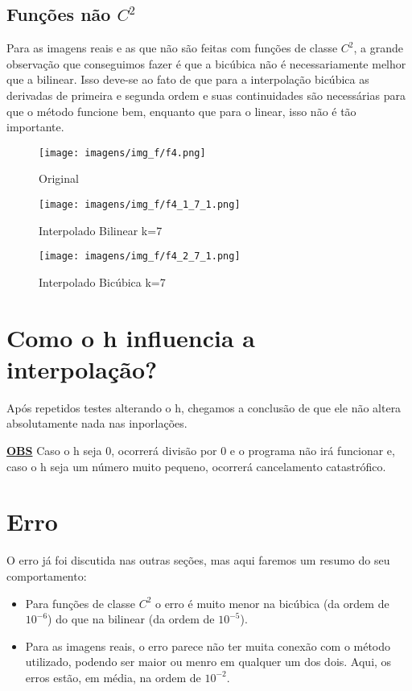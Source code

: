 \documentclass[12pt]{article}
\newcommand{\mytitle}[1]{\textbf{\underline{#1}}}
\begin{document}
\subsection{Funções não $C^2$}
Para as imagens reais e as que não são feitas com funções de classe $C^2$, a grande observação que conseguimos fazer é que a bicúbica não é necessariamente melhor que a bilinear. Isso deve-se ao fato de que para a interpolação bicúbica as derivadas de primeira e segunda ordem e suas continuidades são necessárias para que o método funcione bem, enquanto que para o linear, isso não é tão importante.

\begin{figure}[H]
  \centering
  \begin{minipage}{.5\textwidth}
    \centering
    \texttt{[image: imagens/img\_f/f4.png]}
    \caption{Original}
  \end{minipage}
  \begin{minipage}{.5\linewidth}
  \end{minipage}
  \begin{minipage}{.5\textwidth}
    \centering
    \texttt{[image: imagens/img\_f/f4\_1\_7\_1.png]}
    \caption{Interpolado Bilinear k=7}
  \end{minipage}%
  \begin{minipage}{.5\textwidth}
    \centering
    \texttt{[image: imagens/img\_f/f4\_2\_7\_1.png]}
    \caption{Interpolado Bicúbica k=7}
  \end{minipage}
\end{figure}

\newpage
\section{Como o h influencia a interpolação?}
Após repetidos testes alterando o h, chegamos a conclusão de que ele não altera absolutamente nada nas inporlações.

\mytitle{OBS} Caso o h seja 0, ocorrerá divisão por 0 e o programa não irá funcionar e, caso o h seja um número muito pequeno, ocorrerá cancelamento catastrófico.

\section{Erro}
O erro já foi discutida nas outras seções, mas aqui faremos um resumo do seu comportamento:

\begin{itemize}
  
\item Para funções de classe $C^2$ o erro é muito menor na bicúbica (da ordem de $10^{-6}$) do que na bilinear (da ordem de $10^{-5}$).
  
\item Para as imagens reais, o erro parece não ter muita conexão com o método utilizado, podendo ser maior ou menro em qualquer um dos dois. Aqui, os erros estão, em média, na ordem de $10^{-2}$.
  
\end{itemize}
\end{document}
